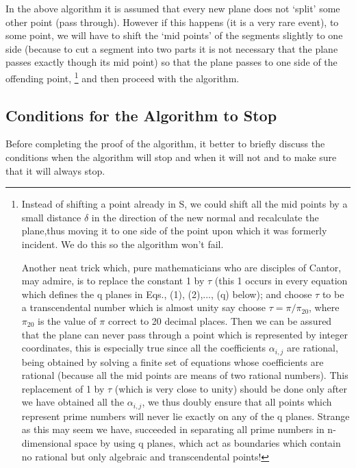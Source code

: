 \documentclass[english]{article}
\begin{document}
In the above algorithm it is assumed that every new plane does not
`split' some other point (pass through). However if this happens (it
is a very rare event), to some point, we will have to shift the `mid
points' of the segments slightly to one side (because to cut a segment
into two parts it is not necessary that the plane passes exactly though
its mid point) so that the plane passes to one side of the offending
point, \footnote{Instead of shifting a point already in S, we could shift all the mid points
by a small distance $\delta$ in the direction of the new normal
and recalculate the plane,thus moving it to one side
of the point upon which it was formerly incident. We do this so the algorithm won't fail. 

Another neat trick
which, pure mathematicians who are disciples of Cantor, may admire, is to replace the constant 1 by $\tau$
 (this 1 occurs in every  equation
 which defines the q  planes in Eqs., (1), (2),..., (q) below); and choose $\tau$ to be a transcendental number which is almost unity say choose $\tau = \pi/ \pi_{20}$, where $\pi_{20}$ is the value of $\pi$ correct  to 20 decimal places.
Then we can be assured that the plane can never pass through a point which is represented by integer coordinates,
 this is especially true since all the coefficients $\alpha_{i,j}$ are rational, being obtained by solving a finite set of equations whose coefficients are rational (because all the mid points are means of two rational numbers). This replacement of 1 by $\tau$ (which is very close to unity) should be done only after we have obtained all the $\alpha_{i,j}$,  we thus doubly ensure that all points which represent prime numbers will never lie exactly on any of the q planes. Strange as this may seem we have, succeeded in separating all prime numbers in n-dimensional space by using q planes, which act as boundaries which contain no rational but only algebraic and transcendental points!} and then proceed with the algorithm.

\medskip{}



\subsection{Conditions for the Algorithm to Stop}

Before completing the proof of the algorithm, it better to briefly discuss
the conditions when the algorithm will stop and when it will not and
to make sure that it will always stop.
\end{document}
